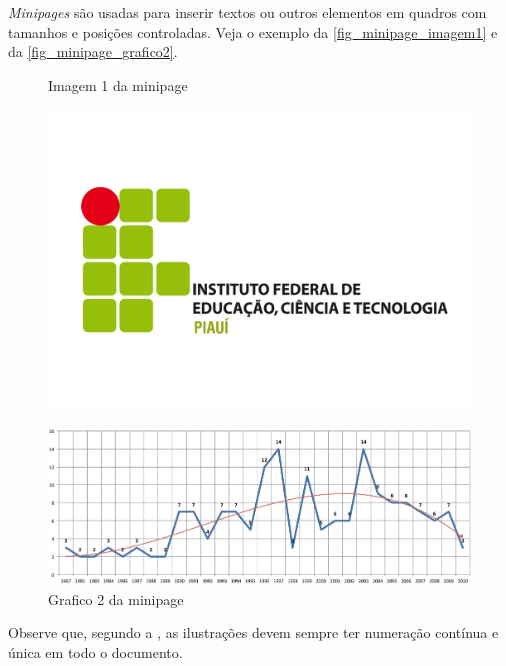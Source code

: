 \emph{Minipages} são usadas para inserir textos ou outros elementos em quadros
com tamanhos e posições controladas. Veja o exemplo da
\autoref{fig_minipage_imagem1} e da \autoref{fig_minipage_grafico2}.

\begin{figure}[htb]
 \label{teste}
 \centering
  \begin{minipage}{0.4\textwidth}
    \centering
    \caption{Imagem 1 da minipage} \label{fig_minipage_imagem1}
    \includegraphics[scale=0.2]{imagens/ifpi.pdf}
  \end{minipage}
  \hfill
  \begin{minipage}{0.4\textwidth}
    \centering
    \caption{Grafico 2 da minipage} \label{fig_minipage_grafico2}
    \includegraphics[scale=0.2]{imagens/abntex2-modelo-img-grafico.pdf}
  \end{minipage}
\end{figure}

Observe que, segundo a , as
ilustrações devem sempre ter numeração contínua e única em todo o documento.

